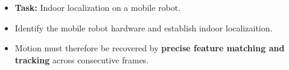{
	
	\begin{itemize}
		\item \textbf{Task:} Indoor localization on a mobile robot.
		\item Identify the mobile robot hardware and establish indoor localizaition.
		\item Motion must therefore be recovered by \textbf{precise feature matching and tracking} across consecutive frames.
	\end{itemize}
}

